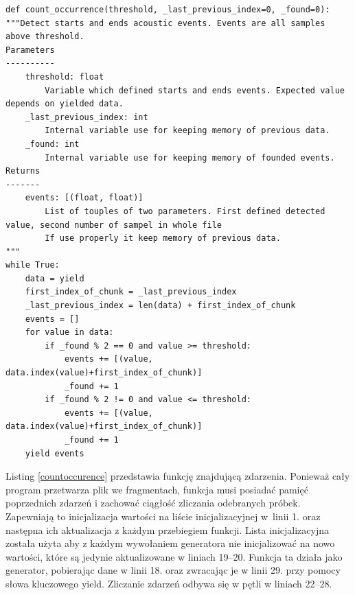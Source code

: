 \documentclass[eng,printmode]{mgr}
\begin{document}
\begin{minipage}{\linewidth}
\begin{lstlisting}[caption={fragment kodu źródłowego pliku Detectors.py, klasa ThresholdCrossDetector, metoda count\_occurrence},captionpos=b,label={countoccurence}]     
    def count_occurrence(threshold, _last_previous_index=0, _found=0):
"""Detect starts and ends acoustic events. Events are all samples above threshold.
Parameters
----------
    threshold: float
        Variable which defined starts and ends events. Expected value depends on yielded data.
    _last_previous_index: int
        Internal variable use for keeping memory of previous data.
    _found: int
        Internal variable use for keeping memory of founded events.
Returns
-------
    events: [(float, float)]
        List of touples of two parameters. First defined detected value, second number of sampel in whole file
        If use properly it keep memory of previous data.
"""
while True:
    data = yield
    first_index_of_chunk = _last_previous_index
    _last_previous_index = len(data) + first_index_of_chunk
    events = []
    for value in data:
        if _found % 2 == 0 and value >= threshold:
            events += [(value, data.index(value)+first_index_of_chunk)]
            _found += 1
        if _found % 2 != 0 and value <= threshold:
            events += [(value, data.index(value)+first_index_of_chunk)]
            _found += 1
    yield events
\end{lstlisting}
\end{minipage}

Listing \ref{countoccurence} przedstawia funkcję znajdującą zdarzenia. Ponieważ cały program przetwarza plik we fragmentach, funkcja musi posiadać pamięć poprzednich zdarzeń i zachować ciągłość zliczania odebranych próbek. Zapewniają to inicjalizacja wartości na liście inicjalizacyjnej w~linii  1. oraz następna ich aktualizacja z każdym przebiegiem funkcji. Lista inicjalizacyjna została użyta aby z każdym wywołaniem generatora nie inicjalizować na nowo wartości, które są jedynie aktualizowane w liniach 19--20. Funkcja ta działa jako generator, pobierając dane w linii 18. oraz zwracając je w linii 29. przy pomocy słowa kluczowego yield. Zliczanie zdarzeń odbywa się w pętli w liniach 22--28.
\end{document}
